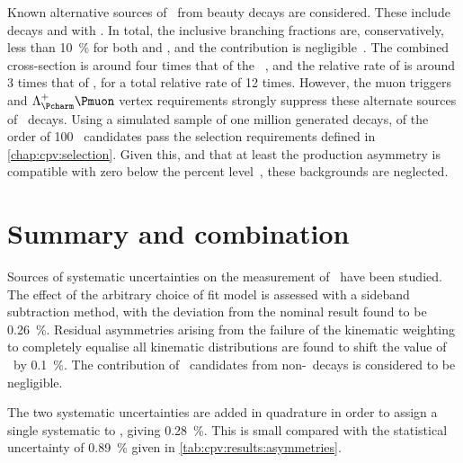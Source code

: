 Known alternative sources of \PLambdac\ from beauty decays are considered.
These include \decay{\PBplus}{\APLambdac\Pproton\Ppiplus} decays and
\decay{\PBplus}{\APSigmac\Pproton\Ppi\Ppi} with 
\decay{\PSigmac}{\PLambdac\Ppi}.
In total, the inclusive  branching fractions are, 
conservatively, less than \SI{10}{\percent} for both \PBplus and \PBzero, and 
the \PBs contribution is negligible~\cite{PDG2014}.
The combined \PB cross-section is around four times that of the 
\PLambdab~\cite{LHCb-PAPER-2013-004,Aaij:2015fea}, and the relative rate of 
 is around 3 times that of \LbToLcmuX, for a total 
relative rate of 12 times.
However, the muon triggers and $\PLambdac\Pmuon$ vertex requirements strongly 
suppress these alternate sources of \PLambdac\ decays.
Using a simulated sample of one million generated 
\decay{\PBzero}{\APLambdac\Pproton\Ppiminus\Ppiplus} decays, of the order of 
100 \PLambdac\ candidates pass the selection requirements defined in 
\cref{chap:cpv:selection}.
Given this, and that at least the \PBzero production asymmetry is compatible 
with zero below the percent level~\cite{Aaij:2014bba}, these backgrounds are 
neglected.

\section{Summary and combination}
\label{chap:cpv:syst:summary}

Sources of systematic uncertainties on the measurement of \dACP\ have been 
studied.
The effect of the arbitrary choice of fit model is assessed with a sideband 
subtraction method, with the deviation from the nominal result found to be 
\SI{0.26}{\percent}.
Residual asymmetries arising from the failure of the kinematic weighting to 
completely equalise all kinematic distributions are found to shift the value of 
\dACP\ by \SI{0.1}{\percent}.
The contribution of \PLambdac\ candidates from non-\PLambdab\ decays is 
considered to be negligible.

The two systematic uncertainties are added in quadrature in order to assign a 
single systematic to \dACP, giving \SI{0.28}{\percent}.
This is small compared with the statistical uncertainty of \SI{0.89}{\percent} 
given in \cref{tab:cpv:results:asymmetries}.
